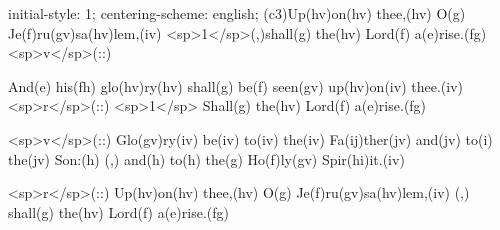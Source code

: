 initial-style: 1;
centering-scheme: english;
(c3)Up(hv)on(hv) thee,(hv) O(g) Je(f)ru(gv)sa(hv)lem,(iv) <sp>1</sp>(,)shall(g) the(hv) Lord(f) a(e)rise.(fg) <sp>v</sp>(::)

And(e) his(fh) glo(hv)ry(hv) shall(g) be(f) seen(gv) up(hv)on(iv) thee.(iv) <sp>r</sp>(::) <sp>1</sp> Shall(g) the(hv) Lord(f) a(e)rise.(fg)

<sp>v</sp>(::) Glo(gv)ry(iv) be(iv) to(iv) the(iv) Fa(ij)ther(jv) and(jv) to(i) the(jv) Son:(h) (,) and(h) to(h) the(g) Ho(f)ly(gv) Spir(hi)it.(iv)

<sp>r</sp>(::) Up(hv)on(hv) thee,(hv) O(g) Je(f)ru(gv)sa(hv)lem,(iv) (,) shall(g) the(hv) Lord(f) a(e)rise.(fg)